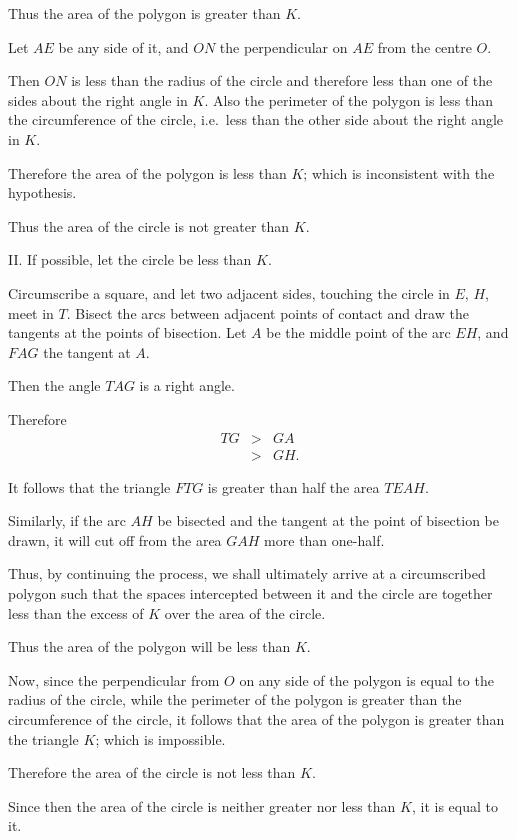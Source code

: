 \documentclass[polutonikogreek,english,twoside,openright]{article}
\begin{document}
Thus the area of the polygon is greater than $K$.

Let $AE$ be any side of it, and $ON$ the perpendicular on $AE$ from
the centre $O$.

Then $ON$ is less than the radius of the circle and therefore less
than one of the sides about the right angle in $K$.  Also the
perimeter of the polygon is less than the circumference of the circle,
i.e.\ less than the other side about the right angle in $K$.

Therefore the area of the polygon is less than $K$; which is
inconsistent with the hypothesis.

Thus the area of the circle is not greater than $K$.

II. If possible, let the circle be less than $K$.

Circumscribe a square, and let two adjacent sides, touching the circle
in $E$, $H$, meet in $T$.  Bisect the arcs between adjacent points of
contact and draw the tangents at the points of bisection.  Let $A$ be
the middle point of the arc $EH$, and $FAG$ the tangent at $A$.

Then the angle $TAG$ is a right angle.

Therefore
$$\begin{array}{ccc}
  TG &>& GA\\
     &>& GH.
\end{array}$$

It follows that the triangle $FTG$ is greater than half the area $TEAH$.

Similarly, if the arc $AH$ be bisected and the tangent at the point of
bisection be drawn, it will cut off from the area $GAH$ more than
one-half.

Thus, by continuing the process, we shall ultimately arrive at a
circumscribed polygon such that the spaces intercepted between it and
the circle are together less than the excess of $K$ over the area of
the circle.

Thus the area of the polygon will be less than $K$.

Now, since the perpendicular from $O$ on any side of the polygon is
equal to the radius of the circle, while the perimeter of the polygon
is greater than the circumference of the circle, it follows that the
area of the polygon is greater than the triangle $K$; which is
impossible.

Therefore the area of the circle is not less than $K$.

Since then the area of the circle is neither greater nor less than
$K$, it is equal to it.
\end{document}
